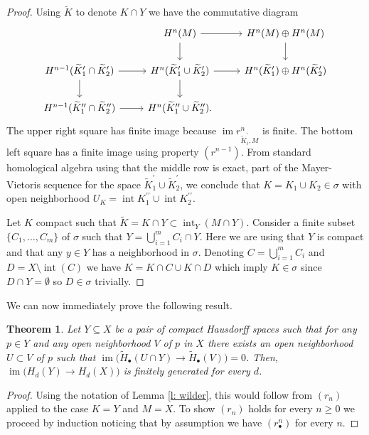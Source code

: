 \documentclass{amsart}
\newtheorem{theorem}{Theorem}
\newcommand{\dprime}{{\prime\prime}}
\DeclareMathOperator{\im}{im}
\DeclareMathOperator{\interior}{int}
\begin{document}
\begin{proof}
		Using $\widetilde{K}$ to denote $K \cap Y$ we have the commutative diagram
		\begin{equation*}
		\begin{tikzcd}
		& \arrow[r] \arrow[d] H^n(M) & H^n(M) \oplus H^n(M) \arrow[d] \\
		H^{n-1}(\widetilde K_1^\prime \cap \widetilde K_2^\prime) \arrow[r] \arrow[d] & 
		H^{n}(\widetilde K_1^\prime \cup \widetilde K_2^\prime) \arrow[r] \arrow[d] &
		H^{n}(\widetilde K_1^\prime) \oplus H^n(\widetilde K_2^\prime) \\
		H^{n-1}(\widetilde K_1^\dprime \cap \widetilde K_2^\dprime) \arrow[r] & 
		H^{n}(\widetilde K_1^\dprime \cup \widetilde K_2^\dprime). &
		\end{tikzcd}
		\end{equation*}
		The upper right square has finite image because $\im r^n_{\widetilde K^\prime_i, M}$ is finite. The bottom left square has a finite image using property $(r^{n-1})$. From standard homological algebra using that the middle row is exact, part of the Mayer-Vietoris sequence for the space $\widetilde K_1^\prime \cup \widetilde K_2^\prime$, we conclude that $K = K_1 \cup K_2 \in \sigma$ with open neighborhood $U_K = \interior K^\dprime_1 \cup \interior K^\dprime_2$.
		
		Let $K$ compact such that $\widetilde K = K \cap Y \subset \interior_Y(M \cap Y)$.
		Consider a finite subset $\{C_1, \dots, C_m\}$ of $\sigma$ such that $Y = \bigcup_{i=1}^m C_i \cap Y$. Here we are using that $Y$ is compact and that any $y \in Y$ has a neighborhood in $\sigma$. Denoting $C = \bigcup_{i=1}^m C_i$ and $D = X \setminus \interior(C)$ we have $K = K \cap C \cup K \cap D$ which imply $K \in \sigma$ since $D \cap Y = \emptyset$ so $D \in \sigma$ trivially.
	\end{proof}
	
	We can now immediately prove the following result.
	
	\begin{theorem}
		Let $Y \subseteq X$ be a pair of compact Hausdorff spaces such that for any $p \in Y$ and any open neighborhood $V$ of $p$ in $X$ there exists an open neighborhood $U \subset V$ of $p$ such that $\im \big(\widetilde H_\bullet(U \cap Y) \to \widetilde H_\bullet(V)\big) = 0$. Then, $\im \big(H_d(Y) \to H_d(X)\big)$ is finitely generated for every $d$.
	\end{theorem}

	\begin{proof}
		Using the notation of Lemma \ref{l: wilder}, this would follow from $(r_n)$ applied to the case $K = Y$ and $M = X$. To show $(r_n)$ holds for every $n \geq 0$ we proceed by induction noticing that by assumption we have $(r^n_\bullet)$ for every $n$. 
	\end{proof}
\end{document}
